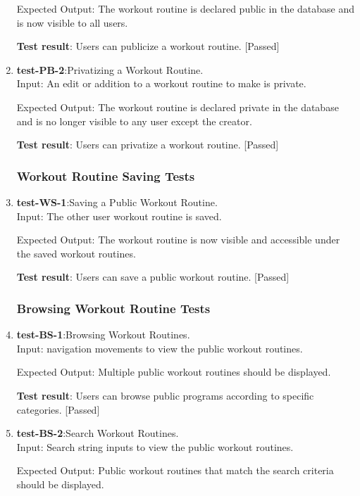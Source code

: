 \documentclass[12pt, titlepage]{article}
\begin{document}
\begin{enumerate}
    Expected Output: The workout routine is declared public in the database and is now visible to all users.
    
    \textbf{Test result}: Users can publicize a workout routine. [Passed]
   
    \item{\textbf{test-PB-2}}:Privatizing a Workout Routine.\\
    Input: An edit or addition to a workout routine to make is private.
	
    Expected Output: The workout routine is declared private in the database and is no longer visible to any user except the creator.
    
    \textbf{Test result}: Users can privatize a workout routine. [Passed]
   
\subsubsection{Workout Routine Saving Tests}
    \item{\textbf{test-WS-1}}:Saving a Public Workout Routine.\\
    Input: The other user workout routine is saved.
	
    Expected Output: The workout routine is now visible and accessible under the saved workout routines.
    
    \textbf{Test result}: Users can save a public workout routine. [Passed]
   
\subsubsection{Browsing Workout Routine Tests}
    \item{\textbf{test-BS-1}}:Browsing Workout Routines.\\
    Input: navigation movements to view the public workout routines.
	
    Expected Output: Multiple public workout routines should be displayed.
     
    \textbf{Test result}: Users can browse public programs according to specific categories. [Passed]
   
    \item{\textbf{test-BS-2}}:Search Workout Routines.\\
    Input: Search string inputs to view the public workout routines.
	
    Expected Output: Public workout routines that match the search criteria should be displayed. 
    

\end{enumerate}
\end{document}
